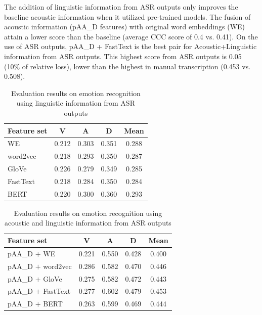 The addition of linguistic information from ASR outputs only improves the
baseline acoustic information when it utilized pre-trained models. The fusion
of acoustic information (pAA\_D features) with original word embeddings (WE)
attain a lower score than the baseline (average CCC score of 0.4 vs. 0.41). On
the use of ASR outputs, pAA\_D + FastText is the best pair for
Acoustic+Linguistic information from ASR outputs. This highest score from ASR
outputs is 0.05 (10\% of relative loss), lower than the highest in manual
transcription (0.453 vs. 0.508).


\begin{table}[htbp]
  \caption{Evaluation results on emotion recognition using linguistic information from ASR outputs}
  \begin{center}
  \begin{tabular}{l | c c c c}
  \hline
Feature set & V & A & D & Mean \\
\hline \hline
WE        & 0.212 & 0.303 & 0.351 & 0.288 \\
word2vec  & 0.218 & 0.293 & 0.350 & 0.287 \\
GloVe     & 0.226 & 0.279 & 0.349 & 0.285 \\
FastText  & 0.218 & 0.284 & 0.350 & 0.284 \\
BERT      & 0.220 & 0.300 & 0.360 & 0.293 \\
  \hline
  \end{tabular}
  \label{tab:ter_asr}
  \end{center}
\end{table}

\begin{table}[htbp]
  \caption{Evaluation results on emotion recognition using acoustic and linguistic information from ASR outputs}
  \begin{center}
  \begin{tabular}{l | c c c c}
  \hline
Feature set & V & A & D & Mean \\
\hline \hline
pAA\_D $+$ WE       & 0.221 & 0.550 & 0.428 & 0.400 \\
pAA\_D $+$ word2vec & 0.286 & 0.582 & 0.470 & 0.446 \\
pAA\_D $+$ GloVe    & 0.275 & 0.582 & 0.472 & 0.443 \\
pAA\_D $+$ FastText & 0.277 & 0.602 & 0.479 & 0.453 \\
pAA\_D $+$ BERT     & 0.263 & 0.599 & 0.469 & 0.444 \\
  \hline
  \end{tabular}
  \label{tab:serter_asr}
\end{center}
\end{table}


